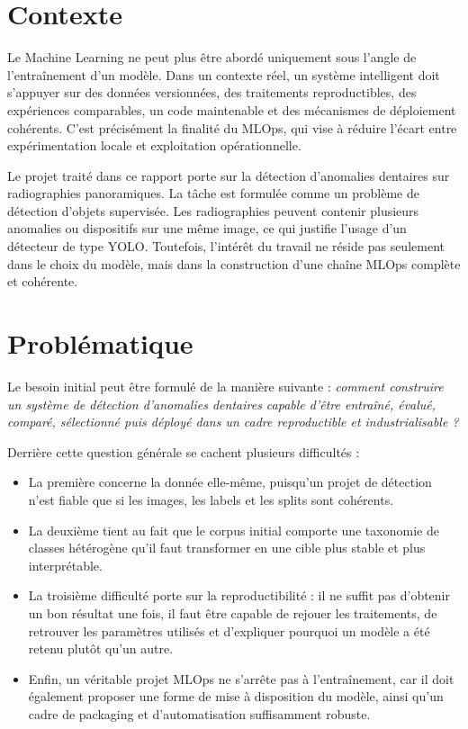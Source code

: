\documentclass[a4paper,12pt]{report}
\begin{document}
\section{Contexte}
Le Machine Learning ne peut plus \^etre abord\'e uniquement sous l'angle de l'entra\^inement d'un mod\`ele. Dans un contexte r\'eel, un syst\`eme intelligent doit s'appuyer sur des donn\'ees versionn\'ees, des traitements reproductibles, des exp\'eriences comparables, un code maintenable et des m\'ecanismes de d\'eploiement coh\'erents. C'est pr\'ecis\'ement la finalit\'e du MLOps, qui vise \`a r\'eduire l'\'ecart entre exp\'erimentation locale et exploitation op\'erationnelle.

Le projet trait\'e dans ce rapport porte sur la d\'etection d'anomalies dentaires sur radiographies panoramiques. La t\^ache est formul\'ee comme un probl\`eme de d\'etection d'objets supervis\'ee. Les radiographies peuvent contenir plusieurs anomalies ou dispositifs sur une m\^eme image, ce qui justifie l'usage d'un d\'etecteur de type YOLO. Toutefois, l'int\'er\^et du travail ne r\'eside pas seulement dans le choix du mod\`ele, mais dans la construction d'une cha\^ine MLOps compl\`ete et coh\'erente.

\section{Probl\'ematique}
Le besoin initial peut \^etre formul\'e de la mani\`ere suivante : \textit{comment construire un syst\`eme de d\'etection d'anomalies dentaires capable d'\^etre entra\^in\'e, \'evalu\'e, compar\'e, s\'electionn\'e puis d\'eploy\'e dans un cadre reproductible et industrialisable ?}

Derri\`ere cette question g\'en\'erale se cachent plusieurs difficult\'es :
\begin{itemize}
\item La premi\`ere concerne la donn\'ee elle-m\^eme, puisqu'un projet de d\'etection n'est fiable que si les images, les labels et les splits sont coh\'erents.
\item La deuxi\`eme tient au fait que le corpus initial comporte une taxonomie de classes h\'et\'erog\`ene qu'il faut transformer en une cible plus stable et plus interpr\'etable.
\item La troisi\`eme difficult\'e porte sur la reproductibilit\'e : il ne suffit pas d'obtenir un bon r\'esultat une fois, il faut \^etre capable de rejouer les traitements, de retrouver les param\`etres utilis\'es et d'expliquer pourquoi un mod\`ele a \'et\'e retenu plut\^ot qu'un autre.
\item Enfin, un v\'eritable projet MLOps ne s'arr\^ete pas \`a l'entra\^inement, car il doit \'egalement proposer une forme de mise \`a disposition du mod\`ele, ainsi qu'un cadre de packaging et d'automatisation suffisamment robuste.
\end{itemize}
\end{document}
